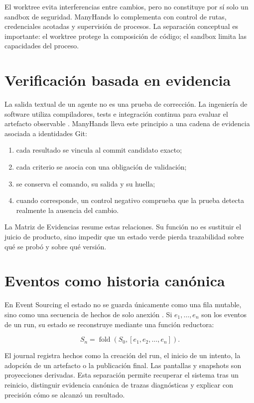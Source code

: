 El worktree evita interferencias entre cambios, pero no constituye por sí solo
un sandbox de seguridad. ManyHands lo complementa con control de rutas,
credenciales acotadas y supervisión de procesos. La separación conceptual es
importante: el worktree protege la composición de código; el sandbox limita las
capacidades del proceso.

\section{Verificación basada en evidencia}

La salida textual de un agente no es una prueba de corrección. La ingeniería de
software utiliza compiladores, tests e integración continua para evaluar el
artefacto observable \cite{humble2010continuous,beck2002tdd}. ManyHands lleva
este principio a una cadena de evidencia asociada a identidades Git:

\begin{enumerate}
  \item cada resultado se vincula al commit candidato exacto;
  \item cada criterio se asocia con una obligación de validación;
  \item se conserva el comando, su salida y su huella;
  \item cuando corresponde, un control negativo comprueba que la prueba detecta
  realmente la ausencia del cambio.
\end{enumerate}

La Matriz de Evidencias resume estas relaciones. Su función no es sustituir el
juicio de producto, sino impedir que un estado verde pierda trazabilidad sobre
qué se probó y sobre qué versión.

\section{Eventos como historia canónica}

En Event Sourcing el estado no se guarda únicamente como una fila mutable, sino
como una secuencia de hechos de solo anexión \cite{fowler2005event,helland2007life}.
Si $e_1,\ldots,e_n$ son los eventos de un run, su estado se reconstruye mediante
una función reductora:

\begin{equation}
S_n = \operatorname{fold}(S_0,[e_1,e_2,\ldots,e_n]).
\label{eq:event-sourcing}
\end{equation}

El journal registra hechos como la creación del run, el inicio de un intento,
la adopción de un artefacto o la publicación final. Las pantallas y snapshots
son proyecciones derivadas. Esta separación permite recuperar el sistema tras
un reinicio, distinguir evidencia canónica de trazas diagnósticas y explicar
con precisión cómo se alcanzó un resultado.
